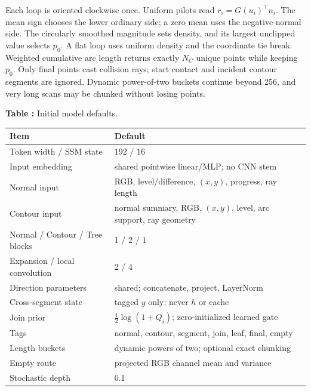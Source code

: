 Each loop is oriented clockwise once. Uniform pilots read $r_i=G(u_i)^{\top}n_i$. The mean sign chooses the lower ordinary side; a zero mean uses the negative-normal side. The circularly smoothed magnitude sets density, and its largest unclipped value selects $p_0$. A flat loop uses uniform density and the coordinate tie break. Weighted cumulative arc length returns exactly $N_C$ unique points while keeping $p_0$. Only final points cast collision rays; start contact and incident contour segments are ignored. Dynamic power-of-two buckets continue beyond 256, and very long scans may be chunked without losing points.

\begin{center}
\label{tab:model-defaults}
\begin{minipage}{\columnwidth}
\centering
\small\textbf{Table \thetable:} Initial model defaults.

\vspace{2pt}
\scriptsize
\begin{tabular}{@{}p{}p{}@{}}
\toprule
Item & Default \\
\midrule
Token width / SSM state & 192 / 16 \\
Input embedding & shared pointwise linear/MLP; no CNN stem \\
Normal input & RGB, level/difference, $(x,y)$, progress, ray length \\
Contour input & normal summary, RGB, $(x,y)$, level, arc support, ray geometry \\
Normal / Contour / Tree blocks & 1 / 2 / 1 \\
Expansion / local convolution & 2 / 4 \\
Direction parameters & shared; concatenate, project, LayerNorm \\
Cross-segment state & tagged $y$ only; never $h$ or cache \\
Join prior & $\tfrac12\log(1+Q_i)$; zero-initialized learned gate \\
Tags & normal, contour, segment, join, leaf, final, empty \\
Length buckets & dynamic powers of two; optional exact chunking \\
Empty route & projected RGB channel mean and variance \\
Stochastic depth & 0.1 \\
\bottomrule
\end{tabular}
\end{minipage}
\end{center}

